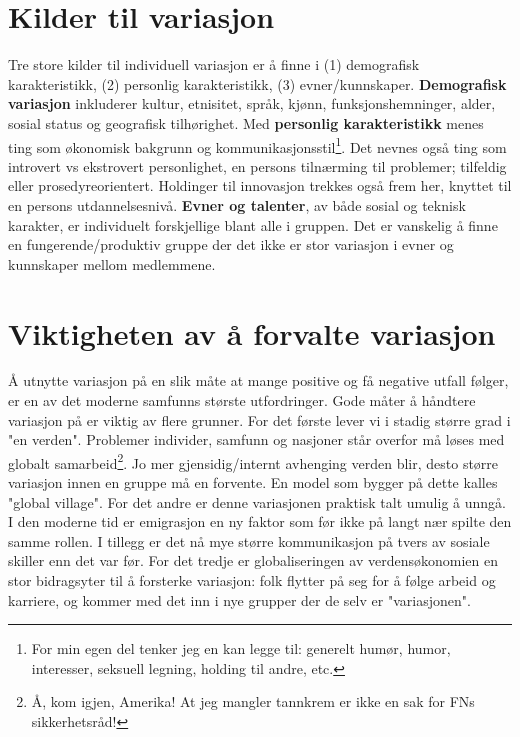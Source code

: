 \documentclass[11pt]{article}
\begin{document}
	\section{Kilder til variasjon}
		Tre store kilder til individuell variasjon er å finne i (1) demografisk karakteristikk, (2) personlig karakteristikk, (3) evner/kunnskaper. 
		\textbf{Demografisk variasjon} inkluderer kultur, etnisitet, språk, kjønn, funksjonshemninger, alder, sosial status og geografisk tilhørighet. Med \textbf{personlig karakteristikk} menes ting som økonomisk bakgrunn og kommunikasjonsstil\footnote{For min egen del tenker jeg en kan legge til: generelt humør, humor, interesser, seksuell legning, holding til andre, etc.}. Det nevnes også ting som introvert vs ekstrovert personlighet, en persons tilnærming til problemer; tilfeldig eller prosedyreorientert. Holdinger til innovasjon trekkes også frem her, knyttet til en persons utdannelsesnivå. \textbf{Evner og talenter}, av både sosial og teknisk karakter, er individuelt forskjellige blant alle i gruppen. Det er vanskelig å finne en fungerende/produktiv gruppe der det ikke er stor variasjon i evner og kunnskaper mellom medlemmene.
		
	\section{Viktigheten av å forvalte variasjon}
		Å utnytte variasjon på en slik måte at mange positive og få negative utfall følger, er en av det moderne samfunns største utfordringer. Gode måter å håndtere variasjon på er viktig av flere grunner. 
		\newline \newline
		For det første lever vi i stadig større grad i "en verden". Problemer individer, samfunn og nasjoner står overfor må løses med globalt samarbeid\footnote{Å, kom igjen, Amerika! At jeg mangler tannkrem er ikke en sak for FNs sikkerhetsråd!}. Jo mer gjensidig/internt avhenging verden blir, desto større variasjon innen en gruppe må en forvente. En model som bygger på dette kalles "global village".
		\newline \newline
		For det andre er denne variasjonen praktisk talt umulig å unngå. I den moderne tid er emigrasjon en ny faktor som før ikke på langt nær spilte den samme rollen. I tillegg er det nå mye større kommunikasjon på tvers av sosiale skiller enn det var før.
		\newline \newline
		For det tredje er globaliseringen av verdensøkonomien en stor bidragsyter til å forsterke variasjon: folk flytter på seg for å følge arbeid og karriere, og kommer med det inn i nye grupper der de selv er "variasjonen". 
		
\end{document}
